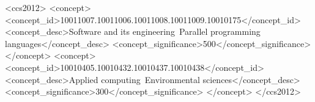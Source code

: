 \documentclass[sigconf, authordraft]{acmart}
\begin{document}
%
%
\begin{CCSXML}
<ccs2012>
<concept>
<concept_id>10011007.10011006.10011008.10011009.10010175</concept_id>
<concept_desc>Software and its engineering~Parallel programming languages</concept_desc>
<concept_significance>500</concept_significance>
</concept>
<concept>
<concept_id>10010405.10010432.10010437.10010438</concept_id>
<concept_desc>Applied computing~Environmental sciences</concept_desc>
<concept_significance>300</concept_significance>
</concept>
</ccs2012>
\end{CCSXML}



\maketitle





\end{document}

